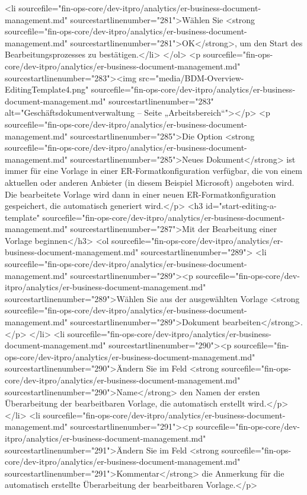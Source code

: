 <li sourcefile="fin-ops-core/dev-itpro/analytics/er-business-document-management.md" sourcestartlinenumber="281">Wählen Sie <strong sourcefile="fin-ops-core/dev-itpro/analytics/er-business-document-management.md" sourcestartlinenumber="281">OK</strong>, um den Start des Bearbeitungsprozesses zu bestätigen.</li>
</ol>
<p sourcefile="fin-ops-core/dev-itpro/analytics/er-business-document-management.md" sourcestartlinenumber="283"><img src="media/BDM-Overview-EditingTemplate4.png" sourcefile="fin-ops-core/dev-itpro/analytics/er-business-document-management.md" sourcestartlinenumber="283" alt="Geschäftsdokumentverwaltung – Seite „Arbeitsbereich“"></p>
<p sourcefile="fin-ops-core/dev-itpro/analytics/er-business-document-management.md" sourcestartlinenumber="285">Die Option <strong sourcefile="fin-ops-core/dev-itpro/analytics/er-business-document-management.md" sourcestartlinenumber="285">Neues Dokument</strong> ist immer für eine Vorlage in einer ER-Formatkonfiguration verfügbar, die von einem aktuellen oder anderen Anbieter (in diesem Beispiel Microsoft) angeboten wird. Die bearbeitete Vorlage wird dann in einer neuen ER-Formatkonfiguration gespeichert, die automatisch generiert wird.</p>
<h3 id="start-editing-a-template" sourcefile="fin-ops-core/dev-itpro/analytics/er-business-document-management.md" sourcestartlinenumber="287">Mit der Bearbeitung einer Vorlage beginnen</h3>
<ol sourcefile="fin-ops-core/dev-itpro/analytics/er-business-document-management.md" sourcestartlinenumber="289">
<li sourcefile="fin-ops-core/dev-itpro/analytics/er-business-document-management.md" sourcestartlinenumber="289"><p sourcefile="fin-ops-core/dev-itpro/analytics/er-business-document-management.md" sourcestartlinenumber="289">Wählen Sie aus der ausgewählten Vorlage <strong sourcefile="fin-ops-core/dev-itpro/analytics/er-business-document-management.md" sourcestartlinenumber="289">Dokument bearbeiten</strong>.</p>
</li>
<li sourcefile="fin-ops-core/dev-itpro/analytics/er-business-document-management.md" sourcestartlinenumber="290"><p sourcefile="fin-ops-core/dev-itpro/analytics/er-business-document-management.md" sourcestartlinenumber="290">Ändern Sie im Feld <strong sourcefile="fin-ops-core/dev-itpro/analytics/er-business-document-management.md" sourcestartlinenumber="290">Name</strong> den Namen der ersten Überarbeitung der bearbeitbaren Vorlage, die automatisch erstellt wird.</p>
</li>
<li sourcefile="fin-ops-core/dev-itpro/analytics/er-business-document-management.md" sourcestartlinenumber="291"><p sourcefile="fin-ops-core/dev-itpro/analytics/er-business-document-management.md" sourcestartlinenumber="291">Ändern Sie im Feld <strong sourcefile="fin-ops-core/dev-itpro/analytics/er-business-document-management.md" sourcestartlinenumber="291">Kommentar</strong> die Anmerkung für die automatisch erstellte Überarbeitung der bearbeitbaren Vorlage.</p>
